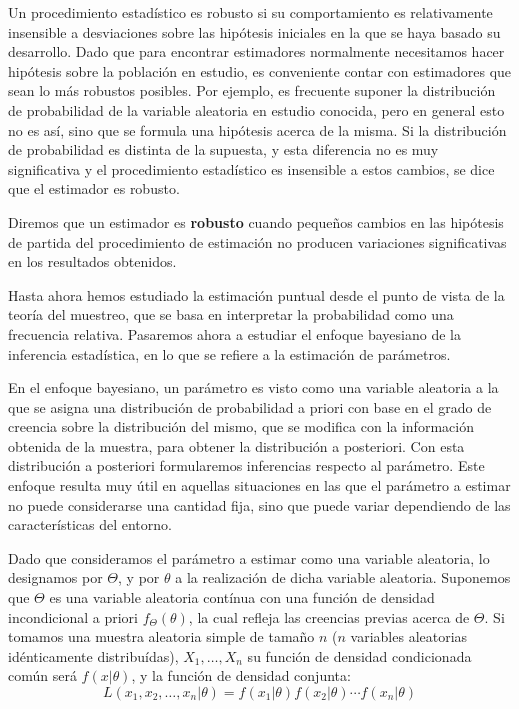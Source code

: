 
Un procedimiento estad\'istico es robusto si su comportamiento es relativamente insensible a desviaciones sobre las hip\'otesis iniciales en la que se haya basado su desarrollo. Dado que para encontrar estimadores normalmente necesitamos hacer hip\'otesis sobre la poblaci\'on en estudio, es conveniente contar con estimadores que sean lo m\'as robustos posibles. Por ejemplo, es frecuente suponer la distribuci\'on de probabilidad de la variable aleatoria en estudio conocida, pero en general esto no es as\'i, sino que se formula una hip\'otesis acerca de la misma. Si la distribuci\'on de probabilidad es distinta de la supuesta, y esta diferencia no es muy significativa y el procedimiento estad\'istico es insensible a estos cambios, se dice que el estimador es robusto.

\begin{definicion}
Diremos que un estimador es \textbf{robusto} cuando peque\~nos cambios en las hip\'otesis de partida del procedimiento de estimaci\'on no producen variaciones significativas en los resultados obtenidos.
\end{definicion}


Hasta ahora hemos estudiado la estimaci\'on puntual desde el punto de vista de la teor\'ia del muestreo, que se basa en interpretar la probabilidad como una frecuencia relativa. Pasaremos ahora a estudiar el enfoque bayesiano de la inferencia estad\'istica, en lo que se refiere a la estimaci\'on de par\'ametros.

En el enfoque bayesiano, un par\'ametro es visto como una variable aleatoria a la que se asigna una distribuci\'on de probabilidad a priori con base en el grado de creencia sobre la distribuci\'on del mismo, que se modifica con la informaci\'on obtenida de la muestra, para obtener la distribuci\'on a posteriori. Con esta distribuci\'on a posteriori formularemos inferencias respecto al par\'ametro. Este enfoque resulta muy \'util en aquellas situaciones en las que el par\'ametro a estimar no puede considerarse una cantidad fija, sino que puede variar dependiendo de las caracter\'isticas del entorno.

Dado que consideramos el par\'ametro a estimar como una variable aleatoria, lo designamos por $\Theta$, y por $\theta$ a la realizaci\'on de dicha variable aleatoria. Suponemos que $\Theta$ es una variable aleatoria cont\'inua con una funci\'on de densidad incondicional a priori $f_{\Theta}(\theta)$, la cual refleja las creencias previas acerca de $\Theta$. Si tomamos una muestra aleatoria simple de tama\~no $n$ ($n$ variables aleatorias id\'enticamente distribu\'idas), $X_1,\ldots,X_n$ su funci\'on de densidad condicionada com\'un ser\'a $f(x|\theta)$, y la funci\'on de densidad conjunta:
\begin{equation*}
L(x_1,x_2,\ldots,x_n|\theta)=f(x_1|\theta)f(x_2|\theta)\cdots f(x_n|\theta)
\end{equation*}

